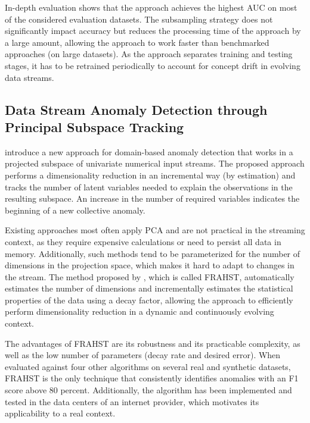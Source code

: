 In-depth evaluation shows that the approach achieves the highest AUC on most of the considered evaluation datasets. The subsampling strategy does not significantly impact accuracy but reduces the processing time of the approach by a large amount, allowing the approach to work faster than benchmarked approaches (on large datasets). As the approach separates training and testing stages, it has to be retrained periodically to account for concept drift in evolving data streams.

\subsection{Data Stream Anomaly Detection through Principal Subspace Tracking \citep{dos_santos_teixeira_data_2010}}
\citet{dos_santos_teixeira_data_2010} introduce a new approach for domain-based anomaly detection that works in a projected subspace of univariate numerical input streams. The proposed approach performs a dimensionality reduction in an incremental way (by estimation) and tracks the number of latent variables needed to explain the observations in the resulting subspace. An increase in the number of required variables indicates the beginning of a new collective anomaly.

Existing approaches most often apply PCA and are not practical in the streaming context, as they require expensive calculations or need to persist all data in memory. Additionally, such methods tend to be parameterized for the number of dimensions in the projection space, which makes it hard to adapt to changes in the stream. The method proposed by \citet{dos_santos_teixeira_data_2010}, which is called FRAHST, automatically estimates the number of dimensions and incrementally estimates the statistical properties of the data using a decay factor, allowing the approach to efficiently perform dimensionality reduction in a dynamic and continuously evolving context.

The advantages of FRAHST are its robustness and its practicable complexity, as well as the low number of parameters (decay rate and desired error). When evaluated against four other algorithms on several real and synthetic datasets, FRAHST is the only technique that consistently identifies anomalies with an F1 score above 80 percent. Additionally, the algorithm has been implemented and tested in the data centers of an internet provider, which motivates its applicability to a real context.


